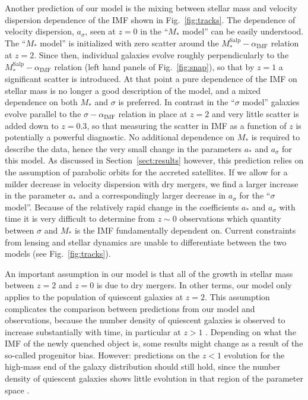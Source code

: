 \documentclass[usenatbib]{mnras}
\def\msalp{M_*^{\mathrm{Salp}}}
\def\aimf{\alpha_{\mathrm{IMF}}}
\def\Sref#1{Section~\ref{#1}\xspace}
\def\Fref#1{Fig.~\ref{#1}\xspace}
\begin{document}
Another prediction of our model is the mixing between stellar mass and
velocity dispersion dependence of the IMF shown in \Fref{fig:tracks}.
The dependence of velocity dispersion, $a_\sigma$, seen at $z=0$ in
the ``$M_*$ model'' can be easily understood.  The ``$M_*$ model'' is
initialized with zero scatter around the $\msalp-\aimf$ relation at
$z=2$.  Since then, individual galaxies evolve roughly perpendicularly
to the $\msalp-\aimf$ relation (left hand panels of \Fref{fig:snap}),
so that by $z=1$ a significant scatter is introduced. At that point a
pure dependence of the IMF on stellar mass is no longer a good
description of the model, and a mixed dependence on both $M_*$ and
$\sigma$ is preferred.  In contrast in the ``$\sigma$ model'' galaxies
evolve parallel to the $\sigma-\aimf$ relation in place at $z=2$ and
very little scatter is added down to $z=0.3$, so that measuring the
scatter in IMF as a function of $z$ is potentially a powerful
diagnostic. No additional dependence on $M_*$ is required to describe
the data, hence the very small change in the parameters $a_*$ and
$a_\sigma$ for this model.  As discussed in \Sref{sect:results}
  however, this prediction relies on the assumption of parabolic
  orbits for the accreted satellites. If we allow for a milder
  decrease in velocity dispersion with dry mergers, we find a larger
  increase in the parameter $a_*$ and a correspondingly larger
  decrease in $a_\sigma$ for the ``$\sigma$ model''. Because of the
relatively rapid change in the coefficients $a_*$ and $a_\sigma$ with
time it is very difficult to determine from $z\sim0$ observations
which quantity between $\sigma$ and $M_*$ is the IMF fundamentally
dependent on. Current constraints from lensing and stellar dynamics
are unable to differentiate between the two models (see
\Fref{fig:tracks}).

An important assumption in our model is that all of the growth in
stellar mass between $z=2$ and $z=0$ is due to dry mergers. In other
terms, our model only applies to the population of quiescent galaxies
at $z=2$. This assumption complicates the comparison between
predictions from our model and observations, because the number
density of quiescent galaxies is observed to increase substantially
with time, in particular at $z>1$ \citep[e.g.][]{Ilb++13,
  Cas++13}. Depending on what the IMF of the newly quenched object is,
some results might change as a result of the so-called progenitor
bias. However: predictions on the $z<1$ evolution for the high-mass
end of the galaxy distribution should still hold, since the number
density of quiescent galaxies shows little evolution in that region of
the parameter space \citep{Lop++12}.
\end{document}
